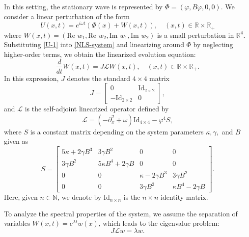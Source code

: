 \documentclass[10pt,reqno,a4paper]{amsart} %
\theoremstyle{definition} %
\numberwithin{equation}{section}
\numberwithin{figure}{section}
\begin{document}
In this setting, the stationary wave is represented by $\Phi = (\varphi, B\varphi, 0, 0)$. We consider a linear perturbation of the form
\begin{equation}\label{U-1}
	U(x,t) = e^{i \omega t} (\Phi(x) + W(x,t)), \quad (x,t) \in \mathbb{R} \times \mathbb{R}_+
\end{equation} 
where $W(x,t) = (\text{Re } w_1, \text{Re } w_2, \text{Im } w_1, \text{Im } w_2)$ is a small perturbation in $\mathbb{R}^4$. Substituting \eqref{U-1} into \eqref{NLS-system} and linearizing around $\Phi$ by neglecting higher-order terms, we obtain the linearized evolution equation:
\begin{equation}\label{spectral}
	\frac{d}{dt} W(x,t) = J \mathcal{L} W(x,t), \quad (x,t) \in \mathbb{R} \times \mathbb{R}_+.
\end{equation}
In this expression, $J$ denotes the standard $4 \times 4$ matrix
\begin{equation}\label{Jmatrix}
J = \begin{bmatrix}
0 & \text{Id}_{2 \times 2} \\
		-\text{Id}_{2 \times 2} & 0    
\end{bmatrix},
\end{equation}
 and $\mathcal{L}$ is the self-adjoint linearized operator defined by
\begin{equation}\label{L-1}
	\mathcal{L} = (-\partial_x^2 + \omega) \text{Id}_{4 \times 4} - \varphi^4 S,
\end{equation}
where $S$ is a constant matrix depending on the system parameters $\kappa, \gamma,$ and $B$ given as
\begin{equation}\label{Smatrix}
    S = \begin{bmatrix}
5\kappa + 2\gamma B^3 & 3\gamma B^2 & 0 & 0 \\
3\gamma B^2 & 5\kappa B^4 + 2\gamma B & 0 & 0 \\
0 & 0 & \kappa - 2\gamma B^3 & 3\gamma B^2 \\
0 & 0 & 3\gamma B^2 & \kappa B^4 - 2\gamma B
\end{bmatrix}.
\end{equation}
Here, given $n \in \mathbb{N}$, we denote by $\text{Id}_{n \times n}$ is the $ n\times n$ identity matrix.

To analyze the spectral properties of the system, we assume the separation of variables $W(x,t) = e^{\lambda t}w(x)$, which leads to the eigenvalue problem:
\begin{equation*}
	J \mathcal{L} w = \lambda w.
\end{equation*} 
\end{document}
